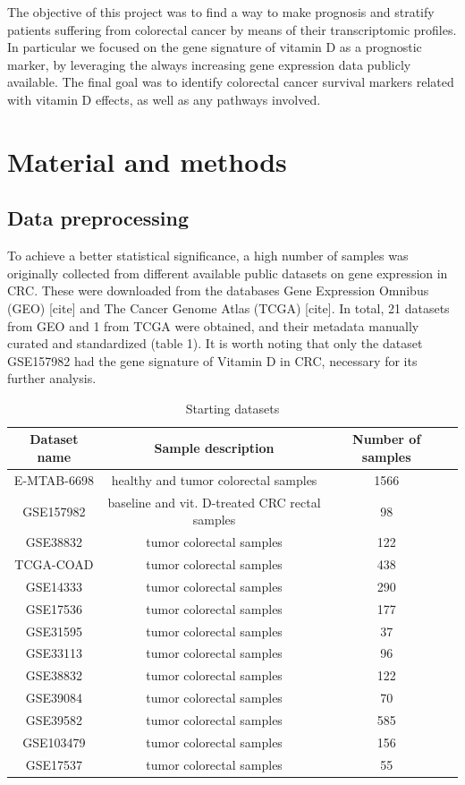 \documentclass[fleqn,10pt]{SelfArx} %
\begin{document}
The objective of this project was to find a way to make prognosis and stratify patients suffering from colorectal cancer by means of their transcriptomic profiles. In particular we focused on the gene signature of vitamin D as a prognostic marker, by leveraging the always increasing gene expression data publicly available. The final goal was to identify colorectal cancer survival markers related with vitamin D effects, as well as any pathways involved.


\section{Material and methods}

	\subsection{Data preprocessing}
	To achieve a better statistical significance, a high number of samples was originally collected from different available public datasets on gene expression in CRC. These were downloaded from the databases Gene Expression Omnibus (GEO) [cite] and The Cancer Genome Atlas (TCGA) [cite]. In total, 21 datasets from GEO and 1 from TCGA were obtained, and their metadata manually curated and standardized (table 1). It is worth noting that only the dataset GSE157982 had the gene signature of Vitamin D in CRC, necessary for its further analysis.

	\begin{table}[ht]
		\centering
		\begin{tabular}{cccc}
			\hline
			Dataset name & Sample description & Number of samples\\
			\hline
			E-MTAB-6698	& healthy and tumor colorectal samples	&1566\\
			GSE157982	&baseline and vit. D-treated CRC rectal samples	&98\\
			GSE38832	&tumor colorectal samples	&122\\
			TCGA-COAD	&tumor colorectal samples	&438\\
			GSE14333	&tumor colorectal samples	&290\\
			GSE17536	&tumor colorectal samples	&177\\
			GSE31595	&tumor colorectal samples	&37	\\
			GSE33113	&tumor colorectal samples	&96	\\
			GSE38832	&tumor colorectal samples	&122\\
			GSE39084	&tumor colorectal samples	&70	\\
			GSE39582	&tumor colorectal samples	&585\\
			GSE103479	&tumor colorectal samples	&156\\
			GSE17537	&tumor colorectal samples	&55	\\
			\hline
		\end{tabular}
		\caption{Starting datasets}
		\label{tab:datasets}
	\end{table}
\end{document}
